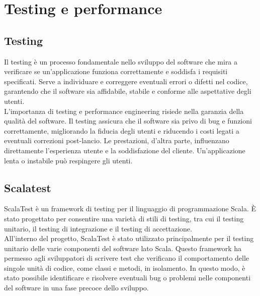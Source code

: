 
\section{Testing e performance}

\subsection{Testing}
Il testing è un processo fondamentale nello sviluppo del software che mira a verificare se un'applicazione
funziona correttamente e soddisfa i requisiti specificati. Serve a individuare e correggere eventuali
errori o difetti nel codice, garantendo che il software sia affidabile, stabile e conforme alle aspettative degli utenti.\\

L'importanza di testing e performance engineering risiede nella garanzia della qualità del software.
Il testing assicura che il software sia privo di bug e funzioni correttamente, migliorando la fiducia
degli utenti e riducendo i costi legati a eventuali correzioni post-lancio. Le prestazioni,
d'altra parte, influenzano direttamente l'esperienza utente e la soddisfazione del cliente.
Un'applicazione lenta o instabile può respingere gli utenti.

\subsection{Scalatest}
ScalaTest \cite{scalatest} è un framework di testing per il linguaggio di programmazione Scala.
È stato progettato per consentire una varietà di stili di testing, tra cui il testing unitario,
il testing di integrazione e il testing di accettazione.\\

All'interno del progetto, ScalaTest è stato utilizzato principalmente per il testing
unitario delle varie componenti del software lato Scala. Questo framework ha permesso agli
sviluppatori di scrivere test che verificano il comportamento delle singole unità di codice,
come classi e metodi, in isolamento. In questo modo, è stato possibile identificare e risolvere
eventuali bug o problemi nelle componenti del software in una fase precoce dello sviluppo.


